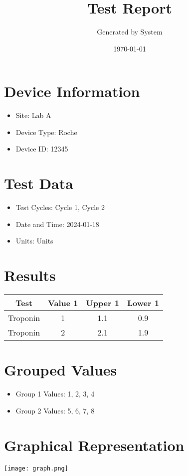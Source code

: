 \documentclass{article}
\begin{document}
\title{Test Report}
\author{Generated by System}
\date{\today}

\maketitle

\section{Device Information}
\begin{itemize}
    \item Site: Lab A
    \item Device Type: Roche
    \item Device ID: 12345
\end{itemize}

\section{Test Data}
\begin{itemize}
    \item Test Cycles: Cycle 1, Cycle 2
    \item Date and Time: 2024-01-18
    \item Units: Units
\end{itemize}

\section{Results}
\begin{tabular}{|c|c|c|c|}
\hline
Test & Value 1 & Upper 1 & Lower 1 \\
\hline
Troponin & 1 & 1.1 & 0.9 \\
Troponin & 2 & 2.1 & 1.9 \\
\hline
\end{tabular}

\section{Grouped Values}
\begin{itemize}
    \item Group 1 Values: 1, 2, 3, 4
    \item Group 2 Values: 5, 6, 7, 8
\end{itemize}

\section{Graphical Representation}
\texttt{[image: graph.png]}
\end{document}
